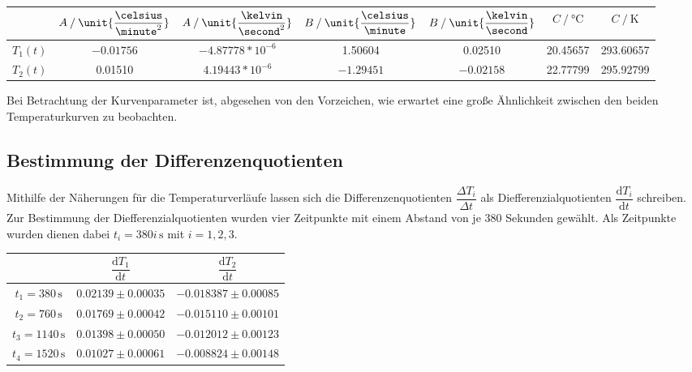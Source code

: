 \begin{table}[H]
  \centering
  \label{tab:ApproxTemp}
  \begin{tabular}{S S S S S S[table-format=2.5] S[table-format=3.5]}
    \toprule
    & {$A \mathbin{/} \unit{\dfrac{\celsius}{\minute^2}}$} & {$A \mathbin{/} \unit{\dfrac{\kelvin}{\second^2}}$} 
    & {$B \mathbin{/} \unit{\dfrac{\celsius}{\minute}}$} & {$B \mathbin{/} \unit{\dfrac{\kelvin}{\second}}$} 
    & {$C \mathbin{/} \unit{\celsius}$} &  {$C \mathbin{/} \unit{\kelvin}$} \\
    \midrule
    {$T_1(t)$} & {$-0.01756$} &  {$-4.87778*10^{-6}$} & {1.50604} & {0.02510} & {20.45657} & {293.60657} \\
    {$T_2(t)$} & {0.01510} & {$4.19443*10^{-6}$} & {$-1.29451$} & {$-0.02158$} & {22.77799} & {295.92799} \\
    \bottomrule
  \end{tabular}
\end{table}
Bei Betrachtung der Kurvenparameter ist, abgesehen von den Vorzeichen, wie erwartet eine große Ähnlichkeit zwischen den
beiden Temperaturkurven zu beobachten.

\newpage

\subsection{Bestimmung der Differenzenquotienten}

Mithilfe der Näherungen für die Temperaturverläufe lassen sich die Differenzenquotienten $\dfrac{ΔT_i}{Δt}$ als Diefferenzialquotienten
$\dfrac{\text{d}T_i}{\text{d}t}$ schreiben.
Zur Bestimmung der Diefferenzialquotienten wurden vier Zeitpunkte mit einem Abstand von je 380 Sekunden gewählt.
Als Zeitpunkte wurden dienen dabei $t_i = 380i \, \unit{\second}$ mit $i=1,2,3$.

\begin{table}[H]
  \centering
  \label{tab:Diffquo}
  \begin{tabular}{S S S}
    \toprule
    & {$\dfrac{\text{d}T_1}{\text{d}t}$} & {$\dfrac{\text{d}T_2}{\text{d}t}$} \\
    \midrule
    {$t_1 = 380  \, \unit{\second}$} & {$0.02139 \pm 0.00035$} & {$-0.018387 \pm 0.00085$} \\
    {$t_2 = 760  \, \unit{\second}$} & {$0.01769 \pm 0.00042$} & {$-0.015110 \pm 0.00101$} \\
    {$t_3 = 1140 \, \unit{\second}$} & {$0.01398 \pm 0.00050$} & {$-0.012012 \pm 0.00123$} \\
    {$t_4 = 1520 \, \unit{\second}$} & {$0.01027 \pm 0.00061$} & {$-0.008824 \pm 0.00148$} \\
    \bottomrule
  \end{tabular}
\end{table}


